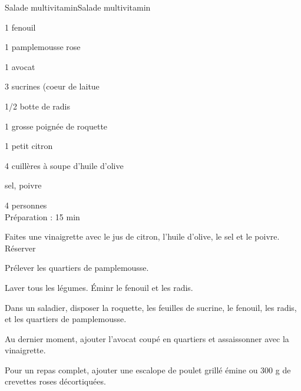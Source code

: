 \begin{recette}{Salade multivitamin}{Salade multivitamin}

\begin{ingredients}
1 fenouil\par
1 pamplemousse rose\par
1 avocat\par
3 sucrines (coeur de laitue\par
1/2 botte de radis\par
1 grosse poignée de roquette\par
1 petit citron\par
4 cuillères à soupe d'huile d'olive\par
sel, poivre\par
\end{ingredients}

\begin{infos}
4 personnes\\
Préparation : 15 min\\
\end{infos}

\begin{etapes}
\item Faites une vinaigrette avec le jus de citron, l'huile d'olive, le sel et le poivre. Réserver
\item Prélever les quartiers de pamplemousse.
\item Laver tous les légumes. Éminr le fenouil et les radis.
\item Dans un saladier, disposer la roquette, les feuilles de sucrine, le fenouil, les radis, et les quartiers de pamplemousse.
\item Au dernier moment, ajouter l'avocat coupé en quartiers et assaissonner avec la vinaigrette.
\item Pour un repas complet, ajouter une escalope de poulet grillé émine ou 300 g de crevettes roses décortiquées.
\end{etapes}

\end{recette}